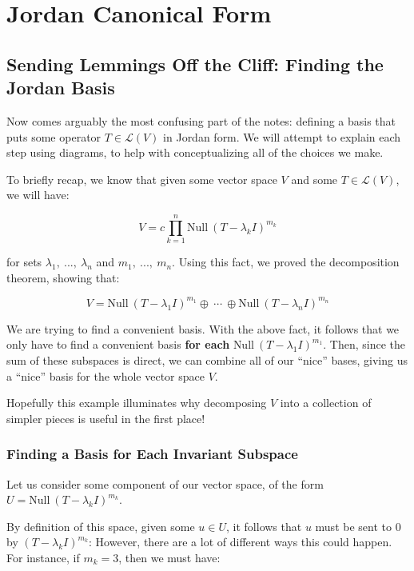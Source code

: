 \documentclass[10pt, oneside]{article}
\begin{document}
   \section{Jordan Canonical Form}

   \subsection{Sending Lemmings Off the Cliff: Finding the Jordan Basis}

   Now comes arguably the most confusing part of the notes: defining a basis that puts some operator
   $T \in \mathcal{L}(V)$ in Jordan form. We will attempt to explain each step using diagrams, to help
   with conceptualizing all of the choices we make.
   \newline

   To briefly recap, we know that given some vector space $V$ and some $T \in \mathcal{L}(V)$, we will have:

   $$V = c \displaystyle\prod_{k = 1}^{n} \text{Null} \ (T - \lambda_k I)^{m_k}$$

   for sets $\lambda_1, \ ..., \ \lambda_n$ and $m_1, \ ..., \ m_n$. Using this fact, we proved the
   decomposition theorem, showing that:

   $$V = \text{Null} \ (T - \lambda_1 I)^{m_1} \oplus \ \cdots \ \oplus \text{Null} \ (T - \lambda_n I)^{m_n}$$

   We are trying to find a convenient basis. With the above fact, it follows that we only have to
   find a convenient basis \textbf{for each} $\text{Null} \ (T - \lambda_1 I)^{m_1}$.
   Then, since the sum of these subspaces is direct,
   we can combine all of our ``nice'' bases, giving us a ``nice'' basis for the whole vector space $V$.
   \newline

   Hopefully this example illuminates why decomposing $V$ into a collection of simpler pieces is useful in
   the first place!

   \subsubsection{Finding a Basis for Each Invariant Subspace}

   Let us consider some component of our vector space, of the form $U = \text{Null} \ (T - \lambda_k I)^{m_k}$.
   \newline

   By definition of this space, given some $u \in U$, it follows that $u$ must be sent to $0$ by $(T - \lambda_k I)^{m_k}$:
   However,
   there are a lot of different ways this could happen. For instance, if $m_k = 3$, then we must have:
\end{document}
